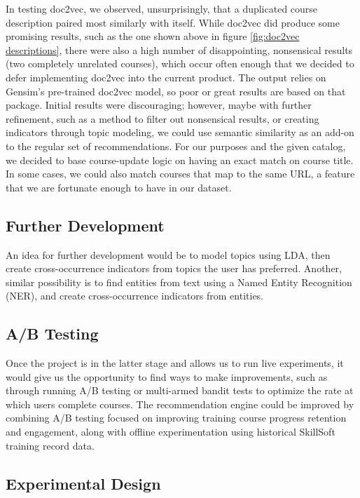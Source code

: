 \documentclass[12pt,journal]{IEEEtran}
\begin{document}
\vspace{5mm}

In testing doc2vec, we observed, unsurprisingly, that a duplicated course description paired most similarly with itself.  While doc2vec did produce some promising results, such as the one shown above in figure \ref{fig:doc2vec descriptions}, there were also a high number of disappointing, nonsensical results (two completely unrelated courses), which occur often enough that we decided to defer implementing doc2vec into the current product.  The output relies on Gensim's pre-trained doc2vec model, so poor or great results are based on that package.  Initial results were discouraging; however, maybe with further refinement, such as a method to filter out nonsensical results, or creating indicators through topic modeling, we could use semantic similarity as an add-on to the regular set of recommendations.  For our purposes and the given catalog, we decided to base course-update logic on having an exact match on course title.  In some cases, we could also match courses that map to the same URL, a feature that we are fortunate enough to have in our dataset.

\subsection{Further Development}

An idea for further development would be to model topics using LDA, then create cross-occurrence indicators from topics the user has preferred.  Another, similar possibility is to find entities from text using a Named Entity Recognition (NER), and create cross-occurrence indicators from entities.

\subsection{A/B Testing}

Once the project is in the latter stage and allows us to run live experiments, it would give us the opportunity to find ways to make improvements, such as through running A/B testing or multi-armed bandit tests to optimize the rate at which users complete courses.   The recommendation engine could be improved by combining A/B testing focused on improving training course progress retention and engagement, along with offline experimentation using historical SkillSoft training record data.

\subsection{Experimental Design}
\end{document}
